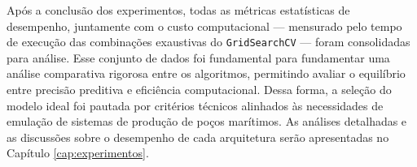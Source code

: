 Após a conclusão dos experimentos, todas as métricas estatísticas de desempenho, juntamente com o custo computacional — mensurado pelo tempo de execução das combinações exaustivas do \texttt{GridSearchCV} — foram consolidadas para análise. Esse conjunto de dados foi fundamental para fundamentar uma análise comparativa rigorosa entre os algoritmos, permitindo avaliar o equilíbrio entre precisão preditiva e eficiência computacional. Dessa forma, a seleção do modelo ideal foi pautada por critérios técnicos alinhados às necessidades de emulação de sistemas de produção de poços marítimos. As análises detalhadas e as discussões sobre o desempenho de cada arquitetura serão apresentadas no Capítulo \ref{cap:experimentos}.


